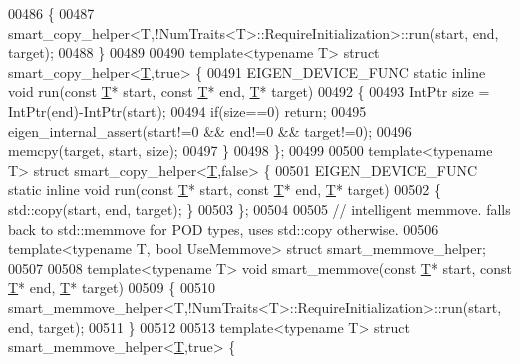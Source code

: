 \begin{DoxyCode}
00486 \{
00487   smart\_copy\_helper<T,!NumTraits<T>::RequireInitialization>::run(start, end, target);
00488 \}
00489 
00490 \textcolor{keyword}{template}<\textcolor{keyword}{typename} T> \textcolor{keyword}{struct }smart\_copy\_helper<\hyperlink{group___sparse_core___module_class_eigen_1_1_triplet}{T},true> \{
00491   EIGEN\_DEVICE\_FUNC \textcolor{keyword}{static} \textcolor{keyword}{inline} \textcolor{keywordtype}{void} run(\textcolor{keyword}{const} \hyperlink{group___sparse_core___module_class_eigen_1_1_triplet}{T}* start, \textcolor{keyword}{const} \hyperlink{group___sparse_core___module_class_eigen_1_1_triplet}{T}* end, \hyperlink{group___sparse_core___module_class_eigen_1_1_triplet}{T}* target)
00492   \{
00493     IntPtr size = IntPtr(end)-IntPtr(start);
00494     \textcolor{keywordflow}{if}(size==0) \textcolor{keywordflow}{return};
00495     eigen\_internal\_assert(start!=0 && end!=0 && target!=0);
00496     memcpy(target, start, size);
00497   \}
00498 \};
00499 
00500 \textcolor{keyword}{template}<\textcolor{keyword}{typename} T> \textcolor{keyword}{struct }smart\_copy\_helper<\hyperlink{group___sparse_core___module_class_eigen_1_1_triplet}{T},false> \{
00501   EIGEN\_DEVICE\_FUNC \textcolor{keyword}{static} \textcolor{keyword}{inline} \textcolor{keywordtype}{void} run(\textcolor{keyword}{const} \hyperlink{group___sparse_core___module_class_eigen_1_1_triplet}{T}* start, \textcolor{keyword}{const} \hyperlink{group___sparse_core___module_class_eigen_1_1_triplet}{T}* end, \hyperlink{group___sparse_core___module_class_eigen_1_1_triplet}{T}* target)
00502   \{ std::copy(start, end, target); \}
00503 \};
00504 
00505 \textcolor{comment}{// intelligent memmove. falls back to std::memmove for POD types, uses std::copy otherwise. }
00506 \textcolor{keyword}{template}<\textcolor{keyword}{typename} T, \textcolor{keywordtype}{bool} UseMemmove> \textcolor{keyword}{struct }smart\_memmove\_helper;
00507 
00508 \textcolor{keyword}{template}<\textcolor{keyword}{typename} T> \textcolor{keywordtype}{void} smart\_memmove(\textcolor{keyword}{const} \hyperlink{group___sparse_core___module_class_eigen_1_1_triplet}{T}* start, \textcolor{keyword}{const} \hyperlink{group___sparse_core___module_class_eigen_1_1_triplet}{T}* end, \hyperlink{group___sparse_core___module_class_eigen_1_1_triplet}{T}* target)
00509 \{
00510   smart\_memmove\_helper<T,!NumTraits<T>::RequireInitialization>::run(start, end, target);
00511 \}
00512 
00513 \textcolor{keyword}{template}<\textcolor{keyword}{typename} T> \textcolor{keyword}{struct }smart\_memmove\_helper<\hyperlink{group___sparse_core___module_class_eigen_1_1_triplet}{T},true> \{

\end{DoxyCode}
